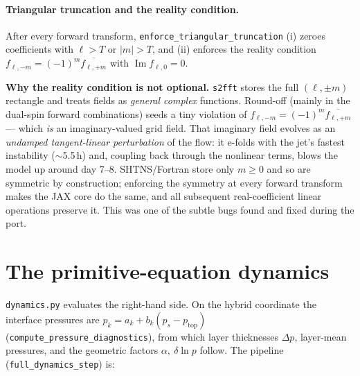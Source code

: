 \documentclass[11pt]{article}
\newcommand{\code}[1]{\texttt{#1}}
\begin{document}
\paragraph{Triangular truncation and the reality condition.} After every forward
transform, \code{enforce\_triangular\_truncation} (i) zeroes coefficients with
$\ell>T$ or $|m|>T$, and (ii) enforces the reality condition
$f_{\ell,-m}=(-1)^m\overline{f_{\ell,+m}}$ with $\operatorname{Im}f_{\ell,0}=0$.

\begin{keybox}
\textbf{Why the reality condition is not optional.} \code{s2fft} stores the full
$(\ell,\pm m)$ rectangle and treats fields as \emph{general complex} functions.
Round-off (mainly in the dual-spin forward combinations) seeds a tiny violation of
$f_{\ell,-m}=(-1)^m\overline{f_{\ell,+m}}$ --- which \emph{is} an imaginary-valued
grid field. That imaginary field evolves as an \emph{undamped tangent-linear
perturbation} of the flow: it e-folds with the jet's fastest instability
($\sim$5.5\,h) and, coupling back through the nonlinear terms, blows the model up
around day 7--8. SHTNS/Fortran store only $m\ge 0$ and so are symmetric by
construction; enforcing the symmetry at every forward transform makes the JAX core
do the same, and all subsequent real-coefficient linear operations preserve it.
This was one of the subtle bugs found and fixed during the port.
\end{keybox}

\section{The primitive-equation dynamics}\label{sec:dynamics}

\code{dynamics.py} evaluates the right-hand side. On the hybrid coordinate the
interface pressures are $p_k = a_k + b_k(p_s - p_{\text{top}})$
(\code{compute\_pressure\_diagnostics}), from which layer thicknesses $\Delta p$,
layer-mean pressures, and the geometric factors $\alpha,\ \delta\!\ln p$ follow.
The pipeline (\code{full\_dynamics\_step}) is:
\end{document}
